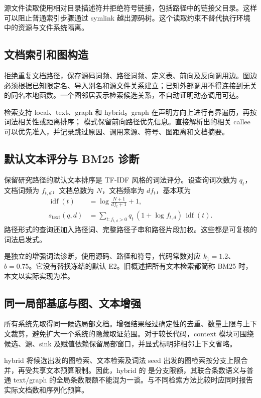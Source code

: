 源文件读取使用相对目录描述符并拒绝符号链接，包括路径中的链接父目录。这样可以阻止普通索引步骤通过 symlink 越出源码树。这个读取约束不替代执行环境中的资源与文件系统隔离。


\subsection{文档索引和图构造}
 拒绝重复文档路径，保存源码词频、路径词频、定义表、前向及反向调用边。图边必须根据已知限定名、导入别名和源文件关系建立；已知外部调用不得连接到无关的同名本地函数。一个图邻居表示检索候选关系，不自动证明动态调用可达。

检索支持 local、text、graph 和 hybrid。graph 在声明方向上进行有界遍历，再按词法相关性或距离排序； 模式保留前向路径优先信息。直接解析出的相关 callee 可以优先准入，并记录跳过原因、调用来源、符号、图距离和文档摘要。

\subsection{默认文本评分与 BM25 诊断}
保留研究路径的默认文本排序是 TF-IDF 风格的词法评分。设查询词次数为 $q_t$，文档词频为 $f_{t,d}$，文档总数为 $N$，文档频率为 $df_t$，基本项为
\begin{align}
\operatorname{idf}(t)&=\log\frac{N+1}{df_t+1}+1,\\
s_{\mathrm{text}}(q,d)&=\sum_{t:f_{t,d}>0}q_t\,(1+\log f_{t,d})\,\operatorname{idf}(t).
\end{align}
路径形式的查询还加入路径词、完整路径子串和路径片段加权。这些都是可复核的词法启发式。

 是独立的增强词法诊断，使用源码、路径和符号，代码常数对应 $k_1=1.2$、$b=0.75$。它没有替换冻结的默认 E2。旧概述把所有文本检索都简称 BM25 时，本文以实际实现为准。

\subsection{同一局部基底与图、文本增强}
所有系统先取得同一候选局部文档。增强结果经过确定性的去重、数量上限与上下文裁剪，避免扩大一个系统的隐藏取证范围。对于较长代码，context 模块可围绕候选、源、sink 及赋值依赖保留局部窗口，并显式标明非相邻上下文省略。

hybrid 将候选出发的图检索、文本检索及词法 seed 出发的图检索按分支上限合并，再受共享文本预算限制。因此，hybrid 的  是分支限额，其联合条数语义与普通 text/graph 的全局条数限额不能混为一谈。与不同检索方法比较时应同时报告实际文档数和序列化预算。


